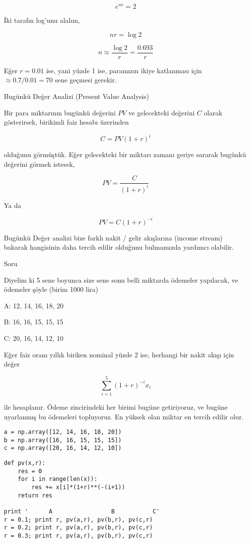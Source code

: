 \documentclass[12pt,fleqn]{article}\usepackage{../../common}
\begin{document}
$$ e^{nr} = 2 $$

İki tarafın log'unu alalım,

$$ nr = \log 2 $$

$$ n \approx \frac{\log 2}{r} = \frac{0.693}{r} $$

Eğer $r = 0.01$ ise, yani yüzde 1 ise, paramızın ikiye katlanması için $\approx
0.7 / 0.01 = 70$ sene geçmesi gerekir. 

Bugünkü Değer Analizi (Present Value Analysis)

Bir para miktarının bugünkü değerini $PV$ ve gelecekteki değerini $C$ olarak
gösterirsek, birikimli faiz hesabı üzerinden

$$ C = PV (1+r)^i $$

olduğunu görmüştük. Eğer gelecekteki bir miktarı zamanı geriye sararak bugünkü
değerini görmek istesek, 

$$ PV = \frac{C}{ (1+r)^i}  $$

Ya da

$$ PV = C (1+r)^{-i}  $$

Bugünkü Değer analizi bize farklı nakit / gelir akışlarına (income stream)
bakarak hangisinin daha tercih edilir olduğunu bulmamızda yardımcı olabilir.

Soru

Diyelim ki 5 sene boyunca size sene sonu belli miktarda ödemeler yapılacak, ve
ödemeler şöyle (birim 1000 lira)

A: 12, 14, 16, 18, 20

B: 16, 16, 15, 15, 15

C: 20, 16, 14, 12, 10

Eğer faiz oranı yıllık biriken nominal yüzde 2 ise, herhangi bir nakit akışı
için değer

$$ \sum_{i=1}^{5} (1+r)^{-i} x_i$$

ile hesaplanır. Ödeme zincirindeki her birimi bugüne getiriyoruz, ve bugüne
uyarlanmış bu ödemeleri topluyoruz. En yüksek olan miktar en tercih edilir
olur. 

\begin{verbatim}
a = np.array([12, 14, 16, 18, 20])
b = np.array([16, 16, 15, 15, 15])
c = np.array([20, 16, 14, 12, 10])
\end{verbatim}


\begin{verbatim}
def pv(x,r):
    res = 0
    for i in range(len(x)):
        res += x[i]*(1+r)**(-(i+1))
    return res

print '      A                 B           C'
r = 0.1; print r, pv(a,r), pv(b,r), pv(c,r)
r = 0.2; print r, pv(a,r), pv(b,r), pv(c,r)
r = 0.3; print r, pv(a,r), pv(b,r), pv(c,r)
\end{verbatim}
\end{document}
